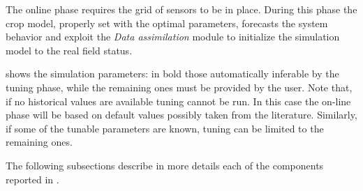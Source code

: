 The online phase requires the grid of sensors to be in place. During this phase the crop model, properly set with the optimal parameters, forecasts the system behavior and exploit the \emph{Data assimilation} module to initialize the simulation model to the real field status.


 shows the simulation parameters: in bold those automatically inferable by the tuning phase, while the remaining ones must be provided by the user. Note that, if no historical values are available tuning cannot be run. In this case the on-line phase will be based on default values possibly taken from the literature. Similarly, if some of the tunable parameters are known, tuning can be limited to the remaining ones.

The following subsections describe in more details each of the components reported in .

